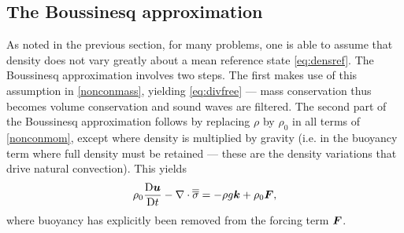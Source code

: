 \subsection{The Boussinesq approximation} \label{sect:boussinesq_approximation}
As noted in the previous section, for many problems, one is able to assume that density does not vary greatly about a mean reference state \eqref{eq:densref}. The Boussinesq approximation involves two steps. The first makes use of this assumption in \eqref{nonconmass}, yielding \eqref{eq:divfree} --- mass conservation thus becomes volume conservation and sound waves are filtered. The second part of the Boussinesq approximation follows by replacing $\rho$ by $\rho_0$ in all terms of \eqref{nonconmom}, except where density is multiplied by gravity (i.e. in the buoyancy term where full density must be retained --- these are the density variations that drive natural convection). This yields
\begin{equation}
\rho_0\frac{\mathrm{D}{\mbox{\boldmath$u$}}}{\mathrm{D} t} -\nabla\cdot\overline{\overline{\sigma}} = -\rho g{\mbox{\boldmath$k$}} +
\rho_0{\mbox{\boldmath$F$}},
\end{equation}
where buoyancy has explicitly been removed from the forcing term ${\mbox{\boldmath$F$}}$.

